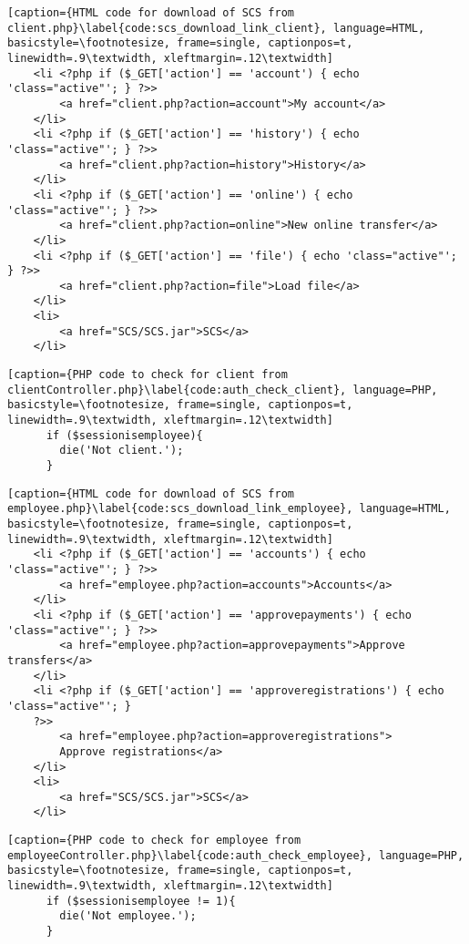 \begin{lstlisting}[caption={HTML code for download of SCS from client.php}\label{code:scs_download_link_client}, language=HTML, basicstyle=\footnotesize, frame=single, captionpos=t, linewidth=.9\textwidth, xleftmargin=.12\textwidth]
    <li <?php if ($_GET['action'] == 'account') { echo 'class="active"'; } ?>>
        <a href="client.php?action=account">My account</a>
    </li>
    <li <?php if ($_GET['action'] == 'history') { echo 'class="active"'; } ?>>
        <a href="client.php?action=history">History</a>
    </li>
    <li <?php if ($_GET['action'] == 'online') { echo 'class="active"'; } ?>>
        <a href="client.php?action=online">New online transfer</a>
    </li>
    <li <?php if ($_GET['action'] == 'file') { echo 'class="active"'; } ?>>
        <a href="client.php?action=file">Load file</a>
    </li>
    <li>
        <a href="SCS/SCS.jar">SCS</a>
    </li>
\end{lstlisting}

\begin{lstlisting}[caption={PHP code to check for client from clientController.php}\label{code:auth_check_client}, language=PHP, basicstyle=\footnotesize, frame=single, captionpos=t, linewidth=.9\textwidth, xleftmargin=.12\textwidth]
      if ($sessionisemployee){
        die('Not client.');
      }
\end{lstlisting}

\begin{lstlisting}[caption={HTML code for download of SCS from employee.php}\label{code:scs_download_link_employee}, language=HTML, basicstyle=\footnotesize, frame=single, captionpos=t, linewidth=.9\textwidth, xleftmargin=.12\textwidth]
    <li <?php if ($_GET['action'] == 'accounts') { echo 'class="active"'; } ?>>
        <a href="employee.php?action=accounts">Accounts</a>
    </li>
    <li <?php if ($_GET['action'] == 'approvepayments') { echo 'class="active"'; } ?>>
        <a href="employee.php?action=approvepayments">Approve transfers</a>
    </li>
    <li <?php if ($_GET['action'] == 'approveregistrations') { echo 'class="active"'; } 
    ?>>
        <a href="employee.php?action=approveregistrations">
        Approve registrations</a>
    </li>
    <li>
        <a href="SCS/SCS.jar">SCS</a>
    </li>
\end{lstlisting}

\begin{lstlisting}[caption={PHP code to check for employee from employeeController.php}\label{code:auth_check_employee}, language=PHP, basicstyle=\footnotesize, frame=single, captionpos=t, linewidth=.9\textwidth, xleftmargin=.12\textwidth]
      if ($sessionisemployee != 1){
      	die('Not employee.');
      }
\end{lstlisting}

